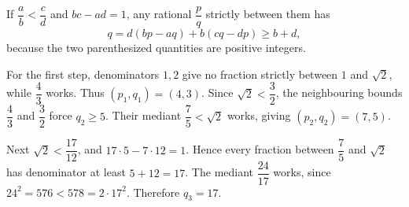 If $\dfrac{a}{b}<\dfrac{c}{d}$ and $bc-ad=1$, any rational $\dfrac{p}{q}$ strictly between them has
\[
q=d(bp-aq)+b(cq-dp)\ge b+d,
\]
because the two parenthesized quantities are positive integers.

For the first step, denominators $1,2$ give no fraction strictly between $1$ and $\sqrt2$, while $\dfrac{4}{3}$ works. Thus $(p_1,q_1)=(4,3)$. Since $\sqrt2<\dfrac{3}{2}$, the neighbouring bounds $\dfrac{4}{3}$ and $\dfrac{3}{2}$ force $q_2\ge5$. Their mediant $\dfrac{7}{5}<\sqrt2$ works, giving $(p_2,q_2)=(7,5)$.

Next $\sqrt2<\dfrac{17}{12}$, and $17\cdot5-7\cdot12=1$. Hence every fraction between $\dfrac{7}{5}$ and $\sqrt2$ has denominator at least $5+12=17$. The mediant $\dfrac{24}{17}$ works, since $24^2=576<578=2\cdot17^2$. Therefore $\boxed{q_3=17}$.

